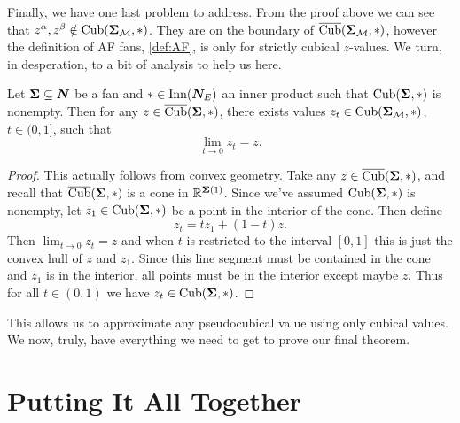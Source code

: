 \documentclass[12pt,oneside]{../../sfsuthesis}
\begin{document}
Finally, we have one last problem to address.
From the proof above we can see that \(  z^\alpha, z^\beta \notin \operatorname{Cub}({\bm{\Sigma}}_{\mathcal{M}}, \ast) \).
They are on the boundary of \( \operatorname{\overline{Cub}}({\bm{\Sigma}}_{\mathcal{M}}, \ast) \), however the definition of AF fans, \th\ref{def:AF}, is only for strictly cubical \( z \)-values.
We turn, in desperation, to a bit of analysis to help us here.
\begin{lemma}\th\label{thm:cubeLimit}
    Let \( {\bm{\Sigma}} \subseteq \bm{N} \) be a fan and \( \ast \in \operatorname{Inn}(\bm{N}_E) \) an inner product such that \( \operatorname{Cub}( {\bm{\Sigma}}, \ast) \) is nonempty.
    Then for any \( z \in \operatorname{\overline{Cub}}({\bm{\Sigma}}, \ast) \), there exists values \( z_t \in \operatorname{Cub}({\bm{\Sigma}}_{\mathcal{M}}, \ast) \), \( t \in (0, 1] \), such that
    \[
        \lim_{t \to 0} z_t = z.
    \]
\end{lemma}
\begin{proof}
    This actually follows from convex geometry.
    Take any \( z \in \operatorname{\overline{Cub}}( {\bm{\Sigma}}, \ast) \), and recall that \(  \operatorname{\overline{Cub}}( {\bm{\Sigma}}, \ast) \) is a cone in \( \mathbb{R}^{{\bm{\Sigma}}(1)} \).
    Since we've assumed \( \operatorname{Cub}( {\bm{\Sigma}}, \ast) \) is nonempty, let \( z_1 \in \operatorname{Cub}( {\bm{\Sigma}}, \ast) \) be a point in the interior of the cone.
    Then define
    \[
        z_t = t z_1 + (1 - t)z.
    \]
    Then \( \lim_{t \to 0} z_t = z \) and when \( t \) is restricted to the interval \( [0,1] \) this is just the convex hull of \( z \) and \( z_1 \).
    Since this line segment must be contained in the cone and \( z_1 \) is in the interior, all points must be in the interior except maybe \( z \).
    Thus for all \( t \in (0,1) \) we have \( z_t \in \operatorname{Cub}( {\bm{\Sigma}}, \ast) \).
\end{proof}
This allows us to approximate any pseudocubical value using only cubical values.
We now, truly, have everything we need to get to prove our final theorem.

\section{Putting It All Together}
\end{document}
